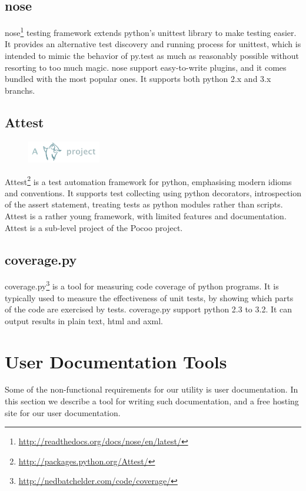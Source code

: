 \subsection{nose}
nose\footnote{\url{http://readthedocs.org/docs/nose/en/latest/}} testing
framework extends \Gls{python}'s unittest \gls{library} to make testing easier.
It provides an alternative test discovery and running process for unittest,
which is intended to mimic the behavior of py.test as much as reasonably
possible without resorting to too much magic. nose support easy-to-write
plugins, and it comes bundled with the most popular ones. It supports both
\Gls{python} 2.x and 3.x \glspl{branch}.

\subsection{Attest}
\label{sec:pre:attest}
\begin{figure}
	\vspace{-20pt}
	\includegraphics[width=3.2cm]{./planning/img/pocoo_logo}
	\vspace{-30pt}
\end{figure}
Attest\footnote{\url{http://packages.python.org/Attest/}} is a test automation
framework for \Gls{python}, emphasising modern idioms and conventions. It supports
test collecting using \Gls{python} decorators, introspection of the assert statement,
treating tests as \Gls{python} modules rather than scripts. Attest is a rather young
framework, with limited features and documentation. Attest is a sub-level
project of the Pocoo project.

\subsection{coverage.py}
coverage.py\footnote{\url{http://nedbatchelder.com/code/coverage/}} is a tool
for measuring code coverage of \Gls{python} programs. It is typically used to measure
the effectiveness of unit tests, by showing which parts of the code are
exercised by tests. coverage.py support \Gls{python} 2.3 to 3.2. It can output
results in plain text, \Gls{html} and \Gls{axml}.


\section{User Documentation Tools}
\label{sec:pre:docs}
Some of the non-functional requirements for our \gls{utility} is user documentation.
In this section we describe a tool for writing such documentation, and a free
hosting site for our user documentation.

